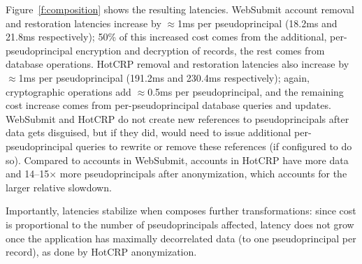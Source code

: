 %
Figure~\ref{f:composition} shows the resulting latencies.
%
WebSubmit account removal and restoration latencies increase by $\approx$1ms per
pseudoprincipal (18.2ms and 21.8ms respectively); 50\% of this increased cost
comes from the additional, per-pseudoprincipal encryption and decryption of
records, the rest comes from database operations.
%
HotCRP removal and restoration latencies also increase by $\approx$1ms
per pseudoprincipal (191.2ms and 230.4ms respectively); again, cryptographic
operations add $\approx$0.5ms per pseudoprincipal, and the remaining cost
increase comes from per-pseudoprincipal database queries and
updates.
%
WebSubmit and HotCRP do not create new references to pseudoprincipals
after data gets disguised, but if they did, \sys would need to issue additional
per-pseudoprincipal queries to rewrite or remove these references (if configured
to do so).
%
Compared to accounts in WebSubmit, accounts in HotCRP have more data and
14--15$\times$ more pseudoprincipals after anonymization, which accounts for the
larger relative slowdown.
%
%
%
%

%
Importantly, \xxing latencies stabilize when \sys composes further \xxing
transformations: since cost is proportional to the number of pseudoprincipals
affected, latency does not grow once the application has maximally decorrelated
data (to one pseudoprincipal per record), as done by HotCRP anonymization.
%



